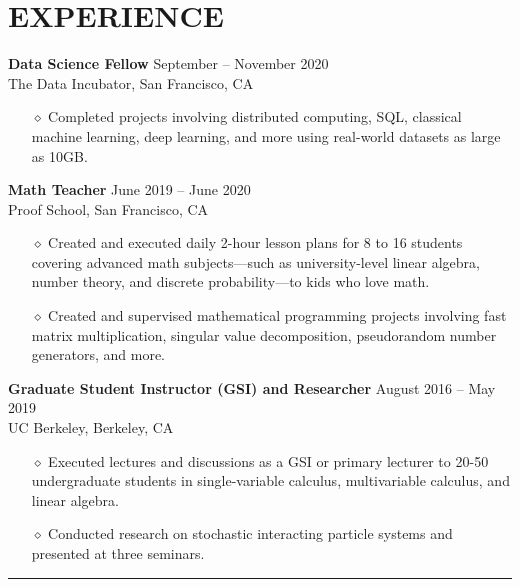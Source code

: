 \documentclass{simplecv}
\begin{document}
\section{EXPERIENCE}
{\bf Data Science Fellow} \hfill September -- November 2020 \\
The Data Incubator, San Francisco, CA
\begin{itemize}
  \itemsep0em
  \item[$\diamond$] Completed projects involving distributed computing, SQL, classical machine learning, deep learning, and more using real-world datasets as large as 10GB.
\end{itemize}
{\bf Math Teacher} \hfill June 2019 -- June 2020 \\
Proof School, San Francisco, CA
\begin{itemize}
  \itemsep0em 
  \item[$\diamond$] Created and executed daily 2-hour lesson plans for 8 to 16 students covering advanced math subjects---such as university-level linear algebra, number theory, and discrete probability---to kids who love math.
  \item[$\diamond$] Created and supervised mathematical programming projects involving fast matrix multiplication, singular value decomposition, pseudorandom number generators, and more.
\end{itemize}
{\bf Graduate Student Instructor (GSI) and Researcher} \hfill August 2016 -- May 2019 \\
UC Berkeley, Berkeley, CA
\begin{itemize}
  \itemsep0em
  \item[$\diamond$] Executed lectures and discussions as a GSI or primary lecturer to 20-50 undergraduate students in single-variable calculus, multivariable calculus, and linear algebra.
  \item[$\diamond$] Conducted research on stochastic interacting particle systems and presented at three seminars.
\end{itemize}

\vspace{-0.4cm}

\rule{10cm}{0.5pt}

\vspace{-0.4cm}
\end{document}

